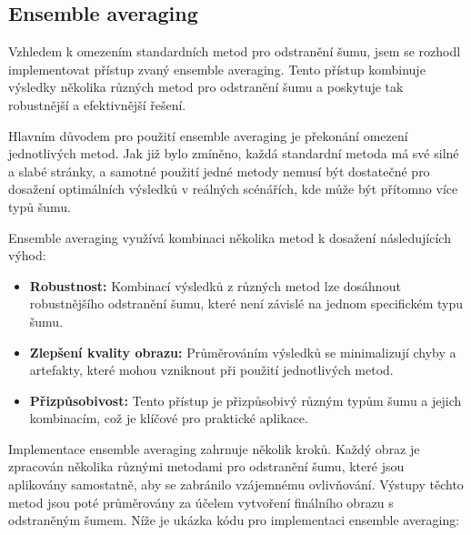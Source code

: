 \documentclass[male,czech,api_ing]{thesis}
\begin{document}
\subsection{Ensemble averaging}
Vzhledem k omezením standardních metod pro odstranění šumu, jsem se rozhodl implementovat přístup zvaný ensemble averaging. Tento přístup kombinuje výsledky několika různých metod pro odstranění šumu a poskytuje tak robustnější a efektivnější řešení.

Hlavním důvodem pro použití ensemble averaging je překonání omezení jednotlivých metod. Jak již bylo zmíněno, každá standardní metoda má své silné a slabé stránky, a samotné použití jedné metody nemusí být dostatečné pro dosažení optimálních výsledků v reálných scénářích, kde může být přítomno více typů šumu.

Ensemble averaging využívá kombinaci několika metod k dosažení následujících výhod:

\begin{itemize}
    \item \textbf{Robustnost:} Kombinací výsledků z různých metod lze dosáhnout robustnějšího odstranění šumu, které není závislé na jednom specifickém typu šumu.
    \item \textbf{Zlepšení kvality obrazu:} Průměrováním výsledků se minimalizují chyby a artefakty, které mohou vzniknout při použití jednotlivých metod.
    \item \textbf{Přizpůsobivost:} Tento přístup je přizpůsobivý různým typům šumu a jejich kombinacím, což je klíčové pro praktické aplikace.
\end{itemize}

Implementace ensemble averaging zahrnuje několik kroků. Každý obraz je zpracován několika různými metodami pro odstranění šumu, které jsou aplikovány samostatně, aby se zabránilo vzájemnému ovlivňování. Výstupy těchto metod jsou poté průměrovány za účelem vytvoření finálního obrazu s odstraněným šumem. Níže je ukázka kódu pro implementaci ensemble averaging:
\end{document}
